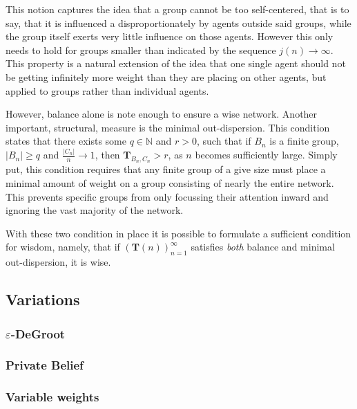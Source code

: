 \documentclass{article}
\newcommand{\T}{\textbf{T}}
\newcommand{\Soc}{(\T(n))^{\infty}_{n=1}}
\begin{document}
This notion captures the idea that a group cannot be too self-centered, that is to say, that it is influenced a disproportionately by agents outside said groups, while the group itself exerts very little influence on those agents. However this only needs to hold for groups smaller than indicated by the sequence $j(n) \to\infty$.
This property is a natural extension of the idea that one single agent should not be getting infinitely more weight than they are placing on other agents, but applied to groups rather than individual agents. \newline

However, balance alone is note enough to ensure a wise network. Another important, structural, measure is the minimal out-dispersion. This condition states that there exists some $q\in \mathbb{N}$ and $r > 0$, such that if $B_n$ is a finite group, $|B_n|\geq q$ and $\frac{|C_n|}{n}\to 1$, then $\textbf{T}_{B_n, C_n} > r$, as $n$ becomes sufficiently large. Simply put, this condition requires that any finite group of a give size must place a minimal amount of weight on a group consisting of nearly the entire network. This prevents specific groups from only focussing their attention inward and ignoring the vast majority of the network.

With these two condition in place it is possible to formulate a sufficient condition for wisdom, namely, that if $\Soc$ satisfies \emph{both} balance and minimal out-dispersion, it is wise.

\subsection{Variations}
\subsubsection{$\varepsilon$-DeGroot}
\subsubsection{Private Belief}
\subsubsection{Variable weights}

\newpage





\end{document}
